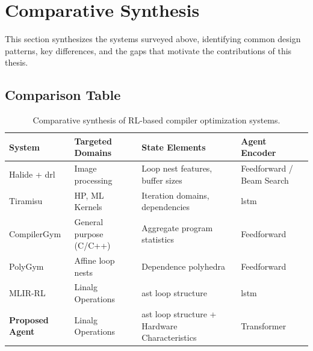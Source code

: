 \section{Comparative Synthesis}

This section synthesizes the systems surveyed above, identifying common design patterns, key differences, and the gaps that motivate the contributions of this thesis.

\subsection{Comparison Table}

\begin{table}[H]
    \centering
    \caption{Comparative synthesis of RL-based compiler optimization systems.}
    \label{tab:related-work-synthesis}
    \vspace{0.2cm}
    \begin{tabularx}{\textwidth}{l >{\raggedright\arraybackslash}p{3.5cm} >{\raggedright\arraybackslash}X >{\raggedright\arraybackslash}p{3cm}}
        \toprule
        \textbf{System} & \textbf{Targeted Domains} & \textbf{State Elements} & \textbf{Agent Encoder} \\
        \midrule
        Halide + \gls{drl} \cite{pecenin2019halide}
        & Image processing
        & Loop nest features, buffer sizes
        & Feedforward / Beam Search \\
        \addlinespace
        Tiramisu \cite{baghdadi2021deep}
        & HP, ML Kernels
        & Iteration domains, dependencies
        & \gls{lstm} \\
        \addlinespace
        CompilerGym \cite{cummins2021compilergym}
        & General purpose (C/C++)
        & Aggregate program statistics
        & Feedforward \\
        \addlinespace
        PolyGym \cite{brauckmann2021polygym}
        & Affine loop nests
        & Dependence polyhedra
        & Feedforward \\
        \addlinespace
        MLIR-RL \cite{tirichine2025reinforcement}
        & Linalg Operations
        & \gls{ast} loop structure
        & \gls{lstm} \\
        \addlinespace
        \textbf{Proposed Agent}
        & Linalg Operations
        &  \gls{ast} loop structure + Hardware Characteristics
        & Transformer \\
        \bottomrule
    \end{tabularx}
\end{table}

